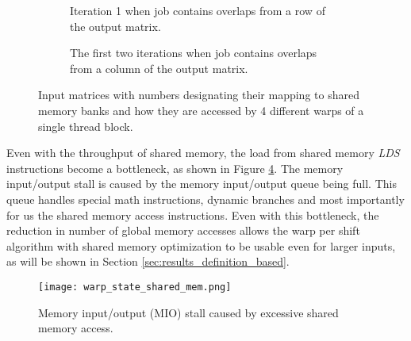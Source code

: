 \begin{figure}[ht]
	
	\centering	
	\begin{subfigure}{0.31\textwidth}
		\centering
		\def\svgwidth{\textwidth}
		\fontsize{6}{8}\selectfont
		
		\caption{Iteration 1 when job contains overlaps from a row of the output matrix.}
		\label{fig:warp_per_shift_shared_mem_overlaps_in_x}
	\end{subfigure}
	\hfill
	\begin{subfigure}{0.5\textwidth}
		\centering
		\def\svgwidth{\textwidth}
		\fontsize{6}{8}\selectfont
		
		\caption{The first two iterations when job contains overlaps from a column of the output matrix.}
		\label{fig:warp_per_shift_shared_mem_shifts}
	\end{subfigure}
	
	\caption{Input matrices with numbers designating their mapping to shared memory banks and how they are accessed by 4 different warps of a single thread block.}
	
	
\end{figure}






Even with the throughput of shared memory, the load from shared memory \textit{LDS} instructions become a bottleneck, as shown in Figure \ref{fig:warp_state_shared_mem}. The memory input/output stall is caused by the memory input/output queue being full. This queue handles special math instructions, dynamic branches and most importantly for us the shared memory access instructions. Even with this bottleneck, the reduction in number of global memory accesses allows the warp per shift algorithm with shared memory optimization to be usable even for larger inputs, as will be shown in Section \ref{sec:results_definition_based}.

\begin{figure}[ht]
	\centering
	\texttt{[image: warp\_state\_shared\_mem.png]}
	\caption{Memory input/output (MIO) stall caused by excessive shared memory access.}
	\label{fig:warp_state_shared_mem}
\end{figure}

